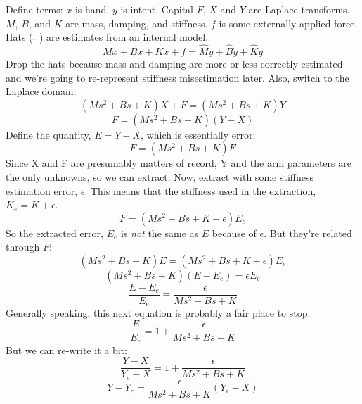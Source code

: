 \documentclass[10pt]{article}
\begin{document}
Define terms: $x$ is hand, $y$ is intent. Capital $F$, $X$ and $Y$ are Laplace transforms. $M$, $B$, and $K$ are mass, damping, and stiffness. $f$ is some externally applied force. Hats ( $\hat{ }$ ) are estimates from an internal model.
\begin{equation}
M\ddot{x}+B\dot{x}+Kx+f=\hat{M}\ddot{y}+\hat{B}\dot{y}+\hat{K}y
\end{equation}
Drop the hats because mass and damping are more or less correctly estimated and we're going to re-represent stiffness misestimation later. Also, switch to the Laplace domain:
\begin{equation}
(Ms^2+Bs+K)X+F=(Ms^2+Bs+K)Y
\end{equation}  
\begin{equation}
F=(Ms^2+Bs+K)(Y-X)
\end{equation}  
Define the quantity, $E=Y-X$, which is essentially error:
\begin{equation}
F=(Ms^2+Bs+K)E
\end{equation} 
Since X and F are presumably matters of record, Y and the arm parameters are the only unknowns, so we can extract. Now, extract with some stiffness estimation error, $\epsilon$. This means that the stiffness used in the extraction, $K_e=K+\epsilon$.
\begin{equation}
F=(Ms^2+Bs+K+\epsilon)E_e
\end{equation}
So the extracted error, $E_e$ is \textit{not} the same as $E$ because of $\epsilon$. But they're related through $F$:
\begin{equation}
(Ms^2+Bs+K)E=(Ms^2+Bs+K+\epsilon)E_e
\end{equation} 
\begin{equation}
(Ms^2+Bs+K)(E-E_e)=\epsilon E_e
\end{equation} 
\begin{equation}
\frac{E-E_e}{E_e}=\frac{\epsilon}{Ms^2+Bs+K}
\end{equation} 
Generally speaking, this next equation is probably a fair place to stop:
\begin{equation}
\frac{E}{E_e}=1+\frac{\epsilon}{Ms^2+Bs+K}
\end{equation}
But we can re-write it a bit:
\begin{equation}
\frac{Y-X}{Y_e-X}=1+\frac{\epsilon}{Ms^2+Bs+K}
\end{equation} 
\begin{equation}
Y-Y_e=\frac{\epsilon}{Ms^2+Bs+K}(Y_e-X)
\end{equation}
\end{document}
